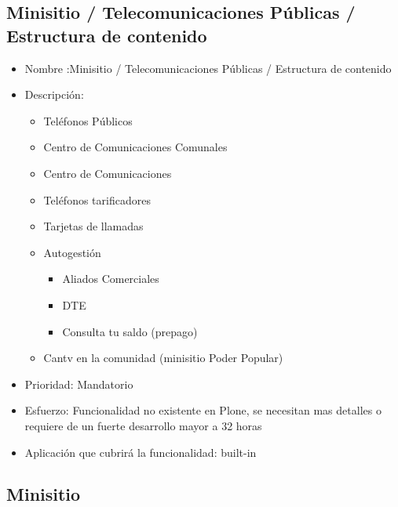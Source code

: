 \documentclass[11pt, letterpaper, oneside, spanish]{scrbook}
\begin{document}
\subsection{Minisitio / Telecomunicaciones Públicas / Estructura de contenido}
\label{sec-2-1-43}

\begin{itemize}
\item Nombre :Minisitio / Telecomunicaciones Públicas / Estructura de contenido
\item Descripción:
\begin{itemize}
\item Teléfonos Públicos
\item Centro de Comunicaciones Comunales
\item Centro de Comunicaciones
\item Teléfonos tarificadores
\item Tarjetas de llamadas
\item Autogestión
\begin{itemize}
\item Aliados Comerciales
\item DTE
\item Consulta tu saldo (prepago)
\end{itemize}
\item Cantv en la comunidad (minisitio Poder Popular)
\end{itemize}
\item Prioridad: Mandatorio
\item Esfuerzo: Funcionalidad no existente en Plone, se necesitan mas detalles o
  requiere de un fuerte desarrollo mayor a 32 horas
\item Aplicación que cubrirá la funcionalidad:  built-in
\end{itemize}
\subsection{Minisitio}
\label{sec-2-1-44}
\end{document}
